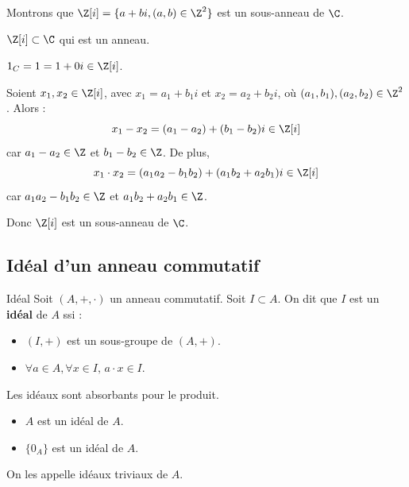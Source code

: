 
\begin{exemple}
    Montrons que $\Z[i] = \{a + bi , (a, b) \in \Z^2\}$ est un sous-anneau de $\C$.

    $\Z[i] \subset \C$ qui est un anneau.

    $1_C = 1 = 1 + 0i \in \Z[i]$.

    Soient $x_1, x_2 \in \Z[i]$, avec $x_1 = a_1 + b_1 i$ et $x_2 = a_2 + b_2 i$,
    où $(a_1, b_1), (a_2, b_2) \in \Z^2$.
    Alors :
    \[x_1 - x_2 = (a_1 - a_2) + (b_1 - b_2)i \in \Z[i]\]
    car $a_1 - a_2 \in \Z$ et $b_1 - b_2 \in \Z$.
    De plus,
    \[x_1 \cdot x_2 = (a_1 a_2 - b_1 b_2) + (a_1 b_2 + a_2 b_1)i \in \Z[i]\]
    car $a_1 a_2 - b_1 b_2 \in \Z$ et $a_1 b_2 + a_2 b_1 \in \Z$.

    Donc $\Z[i]$ est un sous-anneau de $\C$.
\end{exemple}

\subsection{Idéal d'un anneau commutatif}


\begin{definition}{Idéal}{}
    Soit $(A, +, \cdot)$ un anneau commutatif. Soit $I \subset A$. On dit que $I$ est un \textbf{idéal} de $A$ ssi :
    \begin{itemize}
        \item $(I, +)$ est un sous-groupe de $(A, +)$.
        \item $\forall a \in A, \forall x \in I, \, a \cdot x \in I$.
    \end{itemize}
\end{definition}

\begin{remarque}
    Les idéaux sont absorbants pour le produit.
\end{remarque}

\begin{exemple}
    \begin{itemize}
        \item $A$ est un idéal de $A$.
        \item $\{0_A\}$ est un idéal de $A$.
    \end{itemize}
On les appelle idéaux triviaux de $A$.
\end{exemple}

